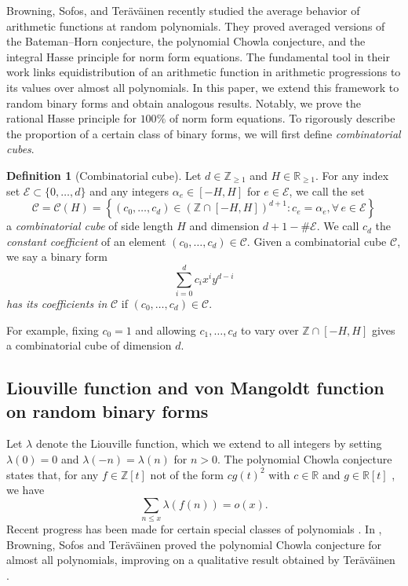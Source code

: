 \documentclass[reqno, 11pt]{amsart}
\renewcommand{\leq}{\leqslant}
\renewcommand{\geq}{\geqslant}
\theoremstyle{definition}
\theoremstyle{definition}
\newtheorem{Definition}[theorem]{Definition}
\renewcommand{\geq}{\geqslant}
\renewcommand{\leq}{\leqslant}
\newcommand{\RR}{\mathbb{R}}
\newcommand{\ZZ}{\mathbb{Z}}
\numberwithin{equation}{section}
\begin{document}
Browning, Sofos, and Ter\"av\"ainen \cite{BST} recently studied the average behavior of arithmetic functions at random polynomials. They proved averaged versions of the Bateman--Horn conjecture, the polynomial Chowla conjecture, and the integral Hasse principle for norm form equations.
The fundamental tool in their work links equidistribution of an arithmetic function in arithmetic progressions to its values over almost all polynomials. In this paper, we extend this framework to random binary forms and obtain analogous results. Notably, we prove the rational Hasse principle for $100\%$ of norm form equations.
To rigorously describe the proportion of a certain class of binary forms, we will first define \emph{combinatorial cubes}.
\begin{Definition}[Combinatorial cube]
	Let $d \in \ZZ_{\geq 1}$ and $H \in \RR_{\geq 1}$. For any index set $\mathcal{E} \subset \{0,\dots,d\}$ and any integers $\alpha_e \in [-H, H]$ for $e \in \mathcal{E}$, we call the set
	$$\mathcal{C} = \mathcal{C}(H) = \left\{ (c_0, \dots, c_d) \in (\ZZ \cap [-H, H])^{d+1}: c_e = \alpha_e, \forall \, e \in \mathcal{E}  \right\}$$
	a \emph{combinatorial cube} of side length $H$ and dimension $d + 1 - \# \mathcal{E}$. We call $c_d$ the \emph{constant coefficient} of an element $(c_0, \dots, c_d) \in \mathcal{C}$. Given a combinatorial cube $\mathcal{C}$, we say a binary form 
	$$\sum_{i=0}^d c_i x^i y^{d-i}$$
	\emph{has its coefficients in} $\mathcal{C}$ if $(c_0, \dots, c_d) \in \mathcal{C}$.
\end{Definition}

For example, fixing $c_0=1$ and allowing $c_1,\dots,c_d$ to vary over $\ZZ \cap [-H,H]$ gives a combinatorial cube of dimension $d$.



\subsection{Liouville function and von Mangoldt function on random binary forms}
Let $\lambda$ denote the Liouville function, which we extend to all integers by setting $\lambda(0) = 0$ and $\lambda(-n) = \lambda(n)$ for $n > 0$. The polynomial Chowla conjecture \cite{Chowla} states that, for any  $f \in \mathbb{Z}[t]$ not of the form  $cg(t)^2$  with $c \in \mathbb{R}$  and $g \in \mathbb{R}[t]$ , we have
$$\sum_{n \leq x} \lambda(f(n)) = o(x).$$
Recent progress has been made for certain special classes of polynomials \cite{Tao2016, TT-ANT, TT-Duke}. In \cite[Theorem 1.5]{BST}, Browning, Sofos and Ter\"av\"ainen proved the polynomial Chowla conjecture for almost all polynomials, improving on a qualitative result obtained by Ter\"av\"ainen \cite[Theorem 2.11]{Joni}. 
\end{document}
